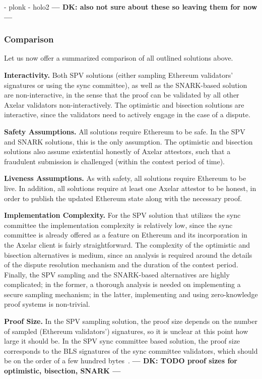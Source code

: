 - plonk
- holo2
\textbf{--- DK: also not sure about these so leaving them for now ---}

\subsubsection{Comparison}

Let us now offer a summarized comparison of all outlined solutions above. 

\noindent\textbf{Interactivity.}
Both SPV solutions (either sampling Ethereum validators' signatures or using
the sync committee), as well as the SNARK-based solution are non-interactive,
in the sense that the proof can be validated by all other Axelar validators
non-interactively. The optimistic and bisection solutions are interactive,
since the validators need to actively engage in the case of a dispute.

\noindent\textbf{Safety Assumptions.}
All solutions require Ethereum to be safe. In the SPV and SNARK solutions, this
is the only assumption. The optimistic and bisection solutions also assume
existential honestly of Axelar attestors, such that a fraudulent submission is
challenged (within the contest period of time).

\noindent\textbf{Liveness Assumptions.}
As with safety, all solutions require Ethereum to be live. In addition, all
solutions require at least one Axelar attestor to be honest, in order to
publish the updated Ethereum state along with the necessary proof.

\noindent\textbf{Implementation Complexity.}
For the SPV solution that utilizes the sync committee the implementation
complexity is relatively low, since the sync committee is already offered as a
feature on Ethereum and its incorporation in the Axelar client is fairly
straightforward. The complexity of the optimistic and bisection alternatives is
medium, since an analysis is required around the details of the dispute
resolution mechanism and the duration of the contest period. Finally, the SPV
sampling and the SNARK-based alternatives are highly complicated; in the
former, a thorough analysis is needed on implementing a secure sampling
mechanism; in the latter, implementing and using zero-knowledge proof systems
is non-trivial.

\noindent\textbf{Proof Size.}
In the SPV sampling solution, the proof size depends on the number of sampled
(Ethereum validators') signatures, so it is unclear at this point how large it
should be. In the SPV sync committee based solution, the proof size corresponds
to the BLS signatures of the sync committee validators, which should be on the
order of a few hundred bytes~\cite{sync-committee}. 
\textbf{--- DK: TODO proof sizes for optimistic, bisection, SNARK ---}

